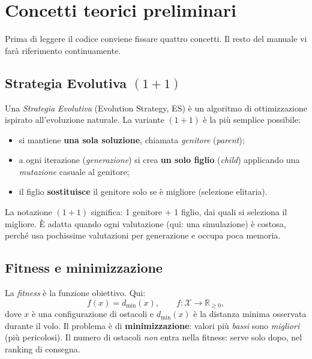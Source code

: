 \documentclass[11pt,a4paper]{report}
\begin{document}
\chapter{Concetti teorici preliminari}

Prima di leggere il codice conviene fissare quattro concetti. Il resto
del manuale vi farà riferimento continuamente.

\section{Strategia Evolutiva \texorpdfstring{$(1+1)$}{(1+1)}}
Una \emph{Strategia Evolutiva} (Evolution Strategy, ES) è un algoritmo
di ottimizzazione ispirato all'evoluzione naturale. La variante
$(1+1)$ è la più semplice possibile:
\begin{itemize}
  \item si mantiene \textbf{una sola soluzione}, chiamata
        \emph{genitore} (\emph{parent});
  \item a ogni iterazione (\emph{generazione}) si crea \textbf{un solo
        figlio} (\emph{child}) applicando una \emph{mutazione} casuale
        al genitore;
  \item il figlio \textbf{sostituisce} il genitore solo se è migliore
        (selezione elitaria).
\end{itemize}
La notazione $(1+1)$ significa: 1 genitore $+$ 1 figlio, dai quali si
seleziona il migliore. È adatta quando ogni valutazione (qui: una
simulazione) è costosa, perché usa pochissime valutazioni per
generazione e occupa poca memoria.

\section{Fitness e minimizzazione}
La \emph{fitness} è la funzione obiettivo. Qui:
\[
f(x) = d_{\min}(x), \qquad f:\mathcal{X}\to\mathbb{R}_{\ge 0},
\]
dove $x$ è una configurazione di ostacoli e $d_{\min}(x)$ è la distanza
minima osservata durante il volo. Il problema è di
\textbf{minimizzazione}: valori più \emph{bassi} sono \emph{migliori}
(più pericolosi). Il numero di ostacoli \emph{non} entra nella fitness:
serve solo dopo, nel ranking di consegna.
\end{document}
